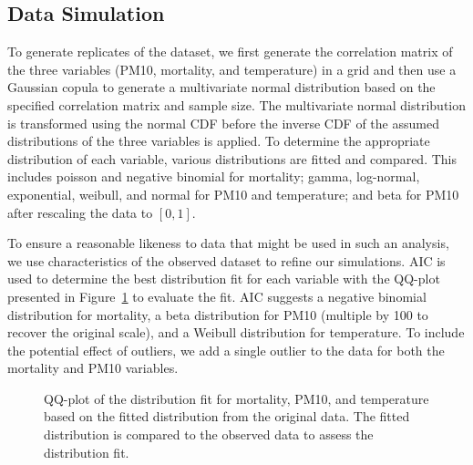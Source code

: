 \documentclass[
  12pt,
]{interact}
\begin{document}
\subsection{Data Simulation}\label{data-simulation}

To generate replicates of the dataset, we first generate the correlation
matrix of the three variables (PM10, mortality, and temperature) in a
grid and then use a Gaussian copula to generate a multivariate normal
distribution based on the specified correlation matrix and sample size.
The multivariate normal distribution is transformed using the normal CDF
before the inverse CDF of the assumed distributions of the three
variables is applied. To determine the appropriate distribution of each
variable, various distributions are fitted and compared. This includes
poisson and negative binomial for mortality; gamma, log-normal,
exponential, weibull, and normal for PM10 and temperature; and beta for
PM10 after rescaling the data to \([0,1]\).

To ensure a reasonable likeness to data that might be used in such an
analysis, we use characteristics of the observed dataset to refine our
simulations. AIC is used to determine the best distribution fit for each
variable with the QQ-plot presented in Figure~\ref{fig-dist-fit} to
evaluate the fit. AIC suggests a negative binomial distribution for
mortality, a beta distribution for PM10 (multiple by 100 to recover the
original scale), and a Weibull distribution for temperature. To include
the potential effect of outliers, we add a single outlier to the data
for both the mortality and PM10 variables.

\label{cell-fig-dist-fit}
\begin{figure}[H]


\caption{\label{fig-dist-fit}QQ-plot of the distribution fit for
mortality, PM10, and temperature based on the fitted distribution from
the original data. The fitted distribution is compared to the observed
data to assess the distribution fit.}

\end{figure}%
\end{document}
